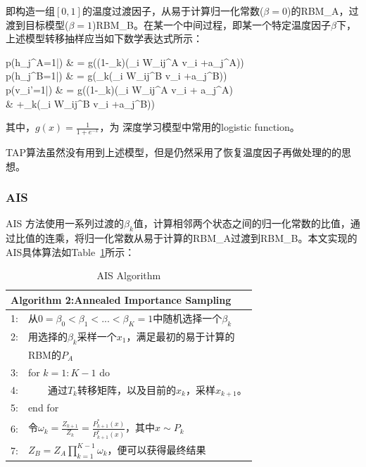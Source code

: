\documentclass[journal,a4paper]{IEEEtran}
\begin{document}
	即构造一组$[0,1]$的温度过渡因子，从易于计算归一化常数($\beta = 0$)的RBM\_A，过渡到目标模型($\beta = 1$)RBM\_B。在某一个中间过程，即某一个特定温度因子$\beta$下，上述模型转移抽样应当如下数学表达式所示：
	\begin{flalign}
	p(h_j^A=1|) & = g\left((1-\beta_k)\left(\sum_i W_{ij}^A v_i +a_j^A\right)\right) \\
	\label{equ3}
	p(h_j^B=1|) & = g\left(\beta_k\left(\sum_i W_{ij}^B v_i +a_j^B\right)\right) \\
	\label{equ4}
	p(v_i'=1|) & = g((1-\beta_k)(\sum_i W_{ij}^A v_i + a_j^A) \\
	 & +\beta_k(\sum_i W_{ij}^B v_i +a_j^B))
    \label{equ5}
	\end{flalign}
	其中，$g(x)=\frac{1}{1+e^{-x}}$，为 深度学习模型中常用的logistic function。
	
	TAP算法虽然没有用到上述模型，但是仍然采用了恢复温度因子再做处理的的思想。

	\subsubsection{AIS\cite{salakhutdinov2009learning}}
		AIS 方法使用一系列过渡的$\beta_k$值，计算相邻两个状态之间的归一化常数的比值，通过比值的连乘，将归一化常数从易于计算的RBM\_A过渡到RBM\_B。本文实现的AIS具体算法如Table~\ref{tab2}所示：
		\begin{table}[h]
			\begin{tabular}{ll}
				\hline
				\multicolumn{2}{l}{\textbf{Algorithm 2:}Annealed Importance Sampling} \\
				\hline
				1: & 从$ 0=\beta_0<\beta_1<...<\beta_K=1$中随机选择一个$\beta_k$\\
				2: & 用选择的$\beta_k$采样一个$x_1$，满足最初的易于计算的\\
				 & RBM的$P_A$ \\
				3: & for $k = 1 : K-1$ do \\
				4: & ~~~~通过$T_k$转移矩阵，以及目前的$x_k$，采样$x_{k+1}$。\\
				5: & end for\\
				6: & 令$ \omega_k = \frac{Z_{k+1}}{Z_k} = \frac{P_{k+1}^*(x)}{P_{k+1}^*(x)}$，其中$ x \sim P_k$\\
				7: & $ Z_B = Z_A\prod_{k=1}^{K-1}\omega_k$，便可以获得最终结果\\

				\hline
			\end{tabular}
			\caption{AIS Algorithm}
			\label{tab2}
		\end{table}
\end{document}

